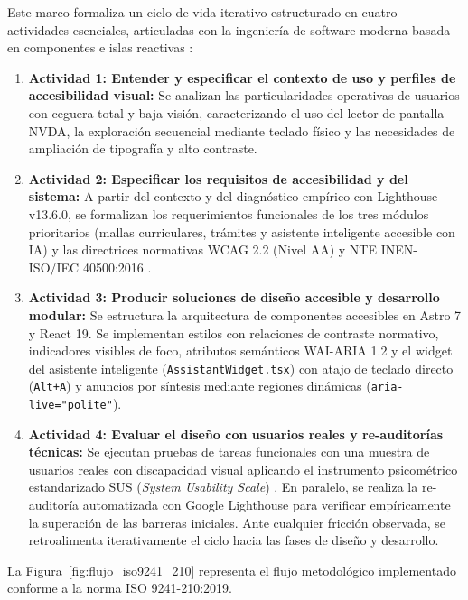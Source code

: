 Este marco formaliza un ciclo de vida iterativo estructurado en cuatro actividades esenciales, articuladas con la ingeniería de software moderna basada en componentes e islas reactivas \cite{peltonen2021microfrontends,sommerville2016software}:
\begin{enumerate}
  \item \textbf{Actividad 1: Entender y especificar el contexto de uso y perfiles de accesibilidad visual:} Se analizan las particularidades operativas de usuarios con ceguera total y baja visión, caracterizando el uso del lector de pantalla NVDA, la exploración secuencial mediante teclado físico y las necesidades de ampliación de tipografía y alto contraste.
  \item \textbf{Actividad 2: Especificar los requisitos de accesibilidad y del sistema:} A partir del contexto y del diagnóstico empírico con Lighthouse v13.6.0, se formalizan los requerimientos funcionales de los tres módulos prioritarios (mallas curriculares, trámites y asistente inteligente accesible con IA) y las directrices normativas WCAG 2.2 (Nivel AA) y NTE INEN-ISO/IEC 40500:2016 \cite{inen40500}.
  \item \textbf{Actividad 3: Producir soluciones de diseño accesible y desarrollo modular:} Se estructura la arquitectura de componentes accesibles en Astro 7 y React 19. Se implementan estilos con relaciones de contraste normativo, indicadores visibles de foco, atributos semánticos WAI-ARIA 1.2 y el widget del asistente inteligente (\texttt{AssistantWidget.tsx}) con atajo de teclado directo (\texttt{Alt+A}) y anuncios por síntesis mediante regiones dinámicas (\texttt{aria-live="polite"}).
  \item \textbf{Actividad 4: Evaluar el diseño con usuarios reales y re-auditorías técnicas:} Se ejecutan pruebas de tareas funcionales con una muestra de usuarios reales con discapacidad visual aplicando el instrumento psicométrico estandarizado SUS (\textit{System Usability Scale}) \cite{brooke1996sus}. En paralelo, se realiza la re-auditoría automatizada con Google Lighthouse para verificar empíricamente la superación de las barreras iniciales. Ante cualquier fricción observada, se retroalimenta iterativamente el ciclo hacia las fases de diseño y desarrollo.
\end{enumerate}

La Figura~\ref{fig:flujo_iso9241_210} representa el flujo metodológico implementado conforme a la norma ISO 9241-210:2019.

